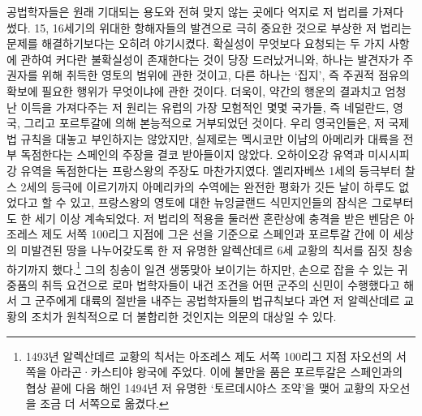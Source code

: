 공법학자들은
원래 기대되는 용도와 전혀 맞지 않는 곳에다 억지로
저 법리를
가져다 썼다.
15, 16세기의 위대한 항해자들의 발견으로 극히 중요한 것으로 부상한
저 법리는
문제를 해결하기보다는 오히려 야기시켰다.
확실성이 무엇보다 요청되는 두 가지 사항에 관하여
커다란 불확실성이 존재한다는 것이 당장 드러났거니와,
하나는 발견자가 주권자를 위해 취득한 영토의 범위에 관한 것이고,
다른 하나는 `집지',
즉 주권적 점유의 확보에
필요한 행위가 무엇이냐에
관한 것이다.
더욱이,
약간의 행운의 결과치고 엄청난 이득을 가져다주는 저 원리는
유럽의 가장 모험적인 몇몇 국가들, 즉 네덜란드, 영국, 그리고 포르투갈에 의해
본능적으로 거부되었던 것이다.
우리 영국인들은,
저 국제법 규칙을 대놓고 부인하지는 않았지만,
실제로는
멕시코만 이남의 아메리카 대륙을 전부 독점한다는 스페인의 주장을
결코 받아들이지 않았다.
오하이오강 유역과 미시시피강 유역을 독점한다는 프랑스왕의 주장도 마찬가지였다.
엘리자베쓰 1세의 등극부터 찰스 2세의 등극에 이르기까지
아메리카의 수역에는 완전한 평화가 깃든 날이
하루도 없었다고 할 수 있고,
프랑스왕의 영토에 대한
뉴잉글랜드 식민지인들의
잠식은
그로부터도 한 세기 이상 계속되었다.
저 법리의 적용을 둘러싼 혼란상에 충격을 받은 벤담은
아조레스 제도 서쪽 100리그 지점에 그은 선을 기준으로
스페인과 포르투갈 간에
이 세상의 미발견된 땅을
나누어갖도록 한
저 유명한 알렉산데르 6세 교황의 칙서를 짐짓 칭송하기까지 했다.\footnote{%
  1493년 알렉산데르 교황의 칙서는
  아조레스 제도 서쪽 100리그 지점 자오선의 서쪽을
  아라곤^^b7카스티야 왕국에 주었다.
  이에 불만을 품은 포르투갈은 스페인과의 협상 끝에
  다음 해인 1494년 저 유명한 `토르데시야스 조약'을 맺어
  교황의 자오선을 조금 더 서쪽으로 옮겼다.
  }
그의 칭송이 일견 생뚱맞아 보이기는 하지만,
손으로 잡을 수 있는 귀중품의 취득 요건으로
로마 법학자들이 내건 조건을
어떤 군주의 신민이
수행했다고 해서 그 군주에게
대륙의 절반을 내주는 공법학자들의 법규칙보다
과연
저 알렉산데르 교황의 조치가
원칙적으로 더 불합리한 것인지는 의문의 대상일 수 있다.

